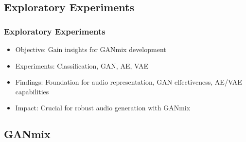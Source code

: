 \subsection{Exploratory Experiments}

\begin{frame}
    \frametitle{Exploratory Experiments}

    \begin{itemize}
        \item Objective: Gain insights for GANmix development
        \item Experiments: Classification, GAN, AE, VAE
        \item Findings: Foundation for audio representation, GAN effectiveness, AE/VAE capabilities
        \item Impact: Crucial for robust audio generation with GANmix
    \end{itemize}

\end{frame}

\subsection{GANmix}

